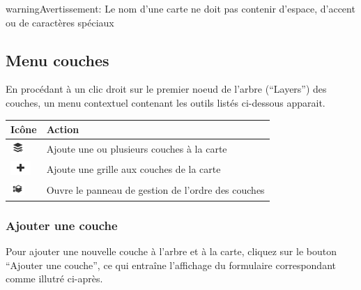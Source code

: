 \documentclass[letterpaper,10pt,french]{sphinxmanual}
\begin{document}

\begin{notice}{warning}{Avertissement:}
Le nom d'une carte ne doit pas contenir d'espace, d'accent ou de caractères spéciaux
\end{notice}


\subsection{Menu couches}
\label{maps/layerstree:menu-couches}
En procédant à un clic droit sur le premier noeud de l'arbre (``Layers'') des couches, un menu contextuel contenant les outils listés ci-dessous apparait.

\begin{tabulary}{\linewidth}{|L|L|}
\hline

\textbf{Icône}
 & 
\textbf{Action}
\\
\hline
\includegraphics{add-layer-m.png}
 & 
Ajoute une ou plusieurs couches à la carte
\\
\hline
\includegraphics{add2.png}
 & 
Ajoute une grille aux couches de la carte
\\
\hline
\includegraphics{move.png}
 & 
Ouvre le panneau de gestion de l'ordre des couches
\\
\hline\end{tabulary}



\subsubsection{Ajouter une couche}
\label{maps/layerstree:ajouter-une-couche}
Pour ajouter une nouvelle couche à l'arbre et à la carte, cliquez sur
le bouton ``Ajouter une couche'', ce qui entraîne l'affichage du
formulaire correspondant comme illutré ci-après.
\end{document}
